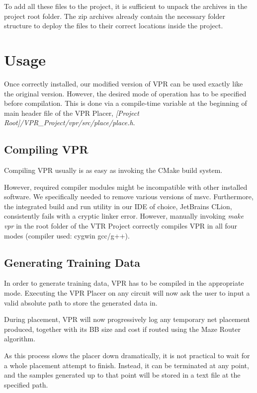 To add all these files to the project, it is sufficient to unpack the archives in the project root folder. The zip archives already contain the necessary folder structure to deploy the files to their correct locations inside the project.

\section{Usage}

Once correctly installed, our modified version of \gls{VPR} can be used exactly like the original version. However, the desired mode of operation has to be specified before compilation. This is done via a compile-time variable at the beginning of main header file of the \gls{VPR} Placer, \textit{[Project Root]/VPR\_Project/vpr/src/place/place.h}.

\subsection{Compiling \gls{VPR}}

Compiling \gls{VPR} usually is as easy as invoking the CMake build system. 

However, required compiler modules might be incompatible with other installed software. We specifically needed to remove various versions of \gls{msvc}. Furthermore, the integrated build and run utility in our IDE of choice, JetBrains CLion, consistently fails with a cryptic linker error. However, manually invoking \textit{make vpr} in the root folder of the \gls{VTR} Project correctly compiles \gls{VPR} in all four modes (compiler used: cygwin gcc/g++).

\subsection{Generating Training Data}

In order to generate training data, \gls{VPR} has to be compiled in the appropriate mode. Executing the \gls{VPR} Placer on any circuit will now ask the user to input a valid absolute path to store the generated data in.

During placement, \gls{VPR} will now progressively log any temporary net placement produced, together with its \gls{BB} size and cost if routed using the Maze Router algorithm.

As this process slows the placer down dramatically, it is not practical to wait for a whole placement attempt to finish. Instead, it can be terminated at any point, and the samples generated up to that point will be stored in a text file at the specified path.

